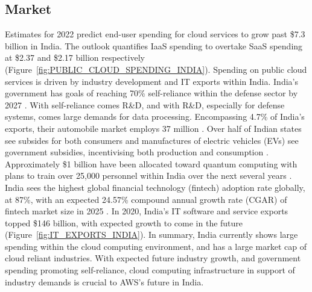\documentclass[a4paper, 12pt]{article}
\begin{document}
\subsection{Market}
Estimates for 2022 predict end-user spending for cloud services to grow past \$7.3 billion in India.
The outlook quantifies IaaS spending to overtake SaaS spending at \$2.37 and \$2.17 billion respectively (Figure~\ref{fig:PUBLIC_CLOUD_SPENDING_INDIA}).
Spending on public cloud services is driven by industry development and IT exports within India.
India's government has goals of reaching 70\% self-reliance within the defense sector by 2027 \cite[p.~10]{INDIA_DEFENSE_CORRIDOR}.
With self-reliance comes R\&D, and with R\&D, especially for defense systems, comes large demands for data processing.
Encompassing 4.7\% of India's exports, their automobile market employs 37 million \cite{INDIA_INVEST_SECTORS}.
Over half of Indian states see subsides for both consumers and manufactures of electric vehicles (EVs) see government subsidies, incentivising both production and consumption \cite[p.~5-28]{INDIA_EV_POLICIES}.
Approximately \$1 billion have been allocated toward quantum computing with plans to train over 25,000 personnel within India over the next several years \cite[p~.16,20]{INDIA_EMERGING_FINANCIALS}.
India sees the highest global financial technology (fintech) adoption rate globally, at 87\%, with an expected 24.57\% compound annual growth rate (CGAR) of fintech market size in 2025 \cite{INDIA_INVEST_SECTORS}.
In 2020, India's IT software and service exports topped \$146 billion, with expected growth to come in the future (Figure~\ref{fig:IT_EXPORTS_INDIA}).
In summary, India currently shows large spending within the cloud computing environment, and has a large market cap of cloud reliant industries.
With expected future industry growth, and government spending promoting self-reliance, cloud computing infrastructure in support of industry demands is crucial to AWS's future in India.

\end{document}
